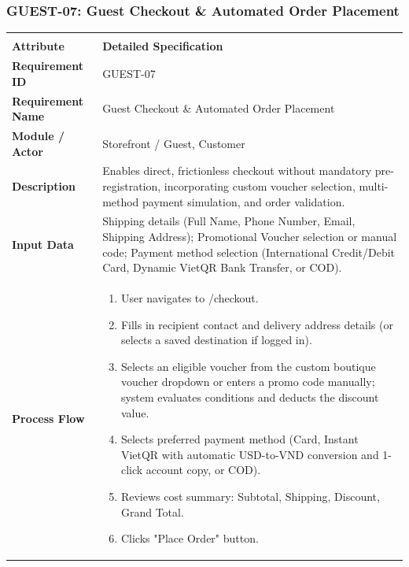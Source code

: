 \documentclass[12pt,a4paper,oneside]{report}
\begin{document}
\subsubsection{GUEST-07: Guest Checkout \& Automated Order Placement}
\begin{longtable}{|p{3.6cm}|p{11.9cm}|}
\hline
\rowcolor{PrimaryBrown}
\multicolumn{2}{|p{15.5cm}|}{\textbf{\textcolor{white}{Functional Specification: GUEST-07 -- Guest Checkout \& Automated Order Placement}}} \\
\hline
\endfirsthead
\hline
\rowcolor{PrimaryBrown}
\multicolumn{2}{|p{15.5cm}|}{\textbf{\textcolor{white}{Functional Specification: GUEST-07 (Continued)}}} \\
\hline
\textbf{Attribute} & \textbf{Detailed Specification} \\
\hline
\endhead
\hline
\endfoot
\textbf{Requirement ID} & GUEST-07 \\
\hline
\textbf{Requirement Name} & Guest Checkout \& Automated Order Placement \\
\hline
\textbf{Module / Actor} & Storefront / Guest, Customer \\
\hline
\textbf{Description} & Enables direct, frictionless checkout without mandatory pre-registration, incorporating custom voucher selection, multi-method payment simulation, and order validation. \\
\hline
\textbf{Input Data} & Shipping details (Full Name, Phone Number, Email, Shipping Address); Promotional Voucher selection or manual code; Payment method selection (International Credit/Debit Card, Dynamic VietQR Bank Transfer, or COD). \\
\hline
\textbf{Process Flow} & \begin{enumerate}[leftmargin=*,nosep,topsep=2pt]
  \item User navigates to /checkout.
  \item Fills in recipient contact and delivery address details (or selects a saved destination if logged in).
  \item Selects an eligible voucher from the custom boutique voucher dropdown or enters a promo code manually; system evaluates conditions and deducts the discount value.
  \item Selects preferred payment method (Card, Instant VietQR with automatic USD-to-VND conversion and 1-click account copy, or COD).
  \item Reviews cost summary: Subtotal, Shipping, Discount, Grand Total.
  \item Clicks "Place Order" button.

\end{enumerate}
\end{longtable}
\end{document}
